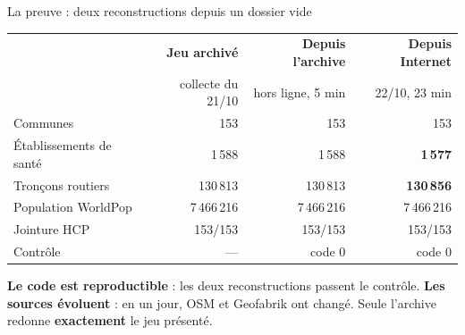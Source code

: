 \documentclass[aspectratio=169,10pt]{beamer}
\newcommand{\ok}{\textcolor{sarcelle}{\bfseries\checkmark}}
\newcommand{\petit}[1]{{\footnotesize\color{gris}#1}}
\begin{document}
\begin{frame}{La preuve : deux reconstructions depuis un dossier vide}
  \small
  \renewcommand{\arraystretch}{1.18}
  \begin{tabularx}{\linewidth}{@{}>{\raggedright\arraybackslash}Xrrr@{}}
    \toprule
    & \textbf{Jeu archivé} & \textbf{Depuis l'archive} & \textbf{Depuis Internet} \\
    & \petit{collecte du 21/10} & \petit{hors ligne, 5 min} & \petit{22/10, 23 min} \\
    \midrule
    Communes & 153 & 153 & 153 \\
    Établissements de santé & 1\,588 & 1\,588 & \textcolor{ambre}{\bfseries 1\,577} \\
    Tronçons routiers & 130\,813 & 130\,813 & \textcolor{ambre}{\bfseries 130\,856} \\
    Population WorldPop & 7\,466\,216 & 7\,466\,216 & 7\,466\,216 \\
    Jointure HCP & 153/153 & 153/153 & 153/153 \\
    Contrôle & — & \ok\ code 0 & \ok\ code 0 \\
    \bottomrule
  \end{tabularx}
  \vskip3mm
  \footnotesize
  \textbf{Le code est reproductible} : les deux reconstructions passent le contrôle.
  \textbf{Les sources évoluent} : en un jour, OSM et Geofabrik ont changé.
  Seule l'archive redonne \textbf{exactement} le jeu présenté.
\end{frame}
\end{document}
